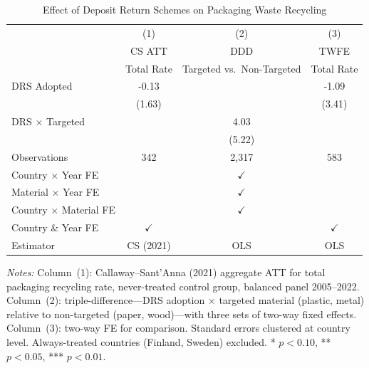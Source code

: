 \begin{table}[H]
\centering
\caption{Effect of Deposit Return Schemes on Packaging Waste Recycling}
\label{tab:main}
\begin{threeparttable}
\begin{tabular}{lccc}
\toprule
 & (1) & (2) & (3) \\
 & CS ATT & DDD & TWFE \\
 & Total Rate & Targeted vs.\ Non-Targeted & Total Rate \\
\midrule
DRS Adopted & -0.13 & & -1.09 \\
 & (1.63) & & (3.41) \\
DRS $\times$ Targeted & & 4.03 & \\
 & & (5.22) & \\
\midrule
Observations & 342 & 2,317 & 583 \\
Country $\times$ Year FE & & $\checkmark$ & \\
Material $\times$ Year FE & & $\checkmark$ & \\
Country $\times$ Material FE & & $\checkmark$ & \\
Country \& Year FE & $\checkmark$ & & $\checkmark$ \\
Estimator & CS (2021) & OLS & OLS \\
\bottomrule
\end{tabular}
\begin{tablenotes}[flushleft]\small
\item \textit{Notes:} Column~(1): Callaway--Sant'Anna (2021) aggregate ATT for total packaging recycling rate, never-treated control group, balanced panel 2005--2022. Column~(2): triple-difference---DRS adoption $\times$ targeted material (plastic, metal) relative to non-targeted (paper, wood)---with three sets of two-way fixed effects. Column~(3): two-way FE for comparison. Standard errors clustered at country level. Always-treated countries (Finland, Sweden) excluded. * $p<0.10$, ** $p<0.05$, *** $p<0.01$.
\end{tablenotes}
\end{threeparttable}
\end{table}


